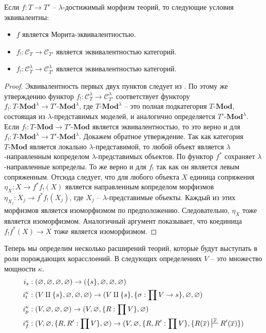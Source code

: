 \documentclass[reqno]{amsart}
\theoremstyle{definition}
\theoremstyle{remark}
\newcommand{\bcat}[1]{\mathbf{#1}}
\newcommand{\cat}[1]{\mathcal{#1}}
\newcommand{\Mod}[1]{#1\text{-}\bcat{Mod}}
\begin{document}
\begin{prop}
Если $f : T \to T'$ -- $\lambda$-достижимый морфизм теорий, то следующие условия эквивалентны:
\begin{itemize}
\item $f$ является Морита-эквивалентностью.
\item $f_! : \cat{C}_T \to \cat{C}_{T'}$ является эквивалентностью категорий.
\item $f_! : \cat{C}_T^\lambda \to \cat{C}_{T'}^\lambda$ является эквивалентностью категорий.
\end{itemize}
\end{prop}
\begin{proof}
Эквивалентность первых двух пунктов следует из .
По этому же утверждению функтор $f_! : \cat{C}_T^\lambda \to \cat{C}_{T'}^\lambda$ соответствует функтору $f_! : \Mod{T}^\lambda \to \Mod{T'}^\lambda$,
где $\Mod{T}^\lambda$ -- это полная подкатегория $\Mod{T}$, состоящая из $\lambda$-представимых моделей, и аналогично определяется $\Mod{T'}^\lambda$.
Если $f_! : \Mod{T} \to \Mod{T'}$ является эквивалентностью, то это верно и для $f_! : \Mod{T}^\lambda \to \Mod{T'}^\lambda$.
Докажем обратное утверждение.
Так как категория $\Mod{T}$ является локально $\lambda$-представимой, то любой объект является $\lambda$-направленным копределом $\lambda$-представимых объектов.
По  функтор $f^*$ сохраняет $\lambda$-направленные копределы.
То же верно и для $f_!$ так как он является левым сопряженным.
Отсюда следует, что для любого объекта $X$ единица сопряжения $\eta_X : X \to f^* f_!(X)$
является направленным копределом морфизмов $\eta_{X_j} : X_j \to f^* f_! (X_j)$, где $X_j$ -- $\lambda$-представимые объекты.
Каждый из этих морфизмов является изоморфизмом по предположению.
Следовательно, $\eta_X$ тоже является изоморфизмом.
Аналогичный аргумент показывает, что коединица $f_! f^*(X) \to X$ тоже является изоморфизмом.
\end{proof}

Теперь мы определим несколько расширений теорий, которые будут выступать в роли порождающих корасслоений.
В следующих определениях $V$ -- это множество мощности $\kappa$.
\begin{align*}
i_s & : (\varnothing,\varnothing,\varnothing,\varnothing) \to (\{ s \},\varnothing,\varnothing,\varnothing) \\
i_t^\kappa & : (V \amalg \{ s \}, \varnothing, \varnothing, \varnothing) \to (V \amalg \{ s \}, \{ \sigma : \prod V \to s \}, \varnothing, \varnothing) \\
i_p^\kappa & : (V, \varnothing, \varnothing, \varnothing) \to (V, \varnothing, \{ R : \prod V \}, \varnothing) \\
i_f^\kappa & : (V, \varnothing, \{ R, R' : \prod V \}, \varnothing) \to (V, \varnothing, \{ R, R' : \prod V \}, \{ R(\overline{x}) \sststile{}{\overline{x}} R'(\overline{x}) \})
\end{align*}
\end{document}
